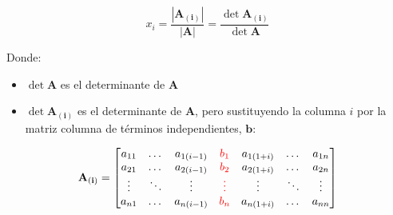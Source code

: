 \documentclass[11pt]{article}
\begin{document}
\begin{equation*}
    x_i = \frac{\left| \mathbf{A_{(i)}} \right|}{\left| \mathbf{A} \right|} = \frac{\det{\mathbf{A_{(i)}}}}{\det{\mathbf{A}}}
\end{equation*}

Donde:

\begin{itemize}
    \item \(\det{\mathbf{A}}\) es el determinante de \(\mathbf{A}\)
    \item \(\det{\mathbf{A_{(i)}}}\) es el determinante de \(\mathbf{A}\), pero 
    sustituyendo la columna \(i\) por la matriz columna de términos 
    independientes, \(\mathbf{b}\):
\end{itemize}

\begin{equation*}
    \mathbf{A_{(i)}} = \begin{bmatrix}
        a_{11} & \dotso & a_{1(i-1)} & \textcolor{red}{b_{1}} & a_{1(1+i)} & \dotso & a_{1n} \\
        a_{21} & \dotso & a_{2(i-1)} & \textcolor{red}{b_{2}} & a_{2(1+i)} & \dotso & a_{2n} \\
        \vdots & \ddots & \vdots & \textcolor{red}{\vdots} & \vdots & \ddots & \vdots \\
        a_{n1} & \dotso & a_{n(i-1)} & \textcolor{red}{b_{n}} & a_{n(1+i)} & \dotso & a_{nn}
        \end{bmatrix}
\end{equation*}

\vspace*{2cm}
\end{document}
